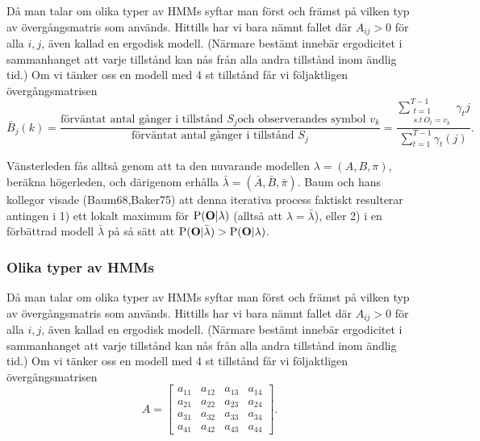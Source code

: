 \documentclass[../rapport_MVEX01-11-05]{subfiles}
\begin{document}
Då man talar om olika typer av HMMs syftar man först och främst på
vilken typ av övergångsmatris som används. Hittills har vi bara nämnt
fallet där $A_{ij} > 0$ för alla $i,j$, även kallad en ergodisk
modell. (Närmare bestämt innebär ergodicitet i sammanhanget att varje
tillstånd kan nås från alla andra tillstånd inom ändlig tid.) Om vi
tänker oss en modell med 4 st tillstånd får vi följaktligen övergångsmatrisen
\begin{equation*}
\bar{B}_j(k) = \frac{\text{förväntat antal gånger i tillstånd $S_j$
    och observerandes symbol $v_k$}}{\text{förväntat antal gånger i
    tillstånd $S_j$}} = \frac{\sum_{\substack{t=1\\s.t~ O_t =
      v_k}}^{T-1}\gamma_t{j}}{\sum_{t=1}^{T-1}\gamma_t(j)}.
\end{equation*}

Vänsterleden fås alltså genom att ta den nuvarande modellen $\lambda =
(A,B,\pi)$, beräkna högerleden, och därigenom erhålla $\bar{\lambda} =
(\bar{A},\bar{B}, \bar{\pi})$. Baum och hans kollegor visade
(Baum68,Baker75) att denna iterativa process faktiskt resulterar
antingen i 1) ett lokalt maximum för $\mathrm{P}(\textbf{O}|\lambda)$
(alltså att $\lambda = \bar{\lambda}$), eller 2) i en förbättrad
modell $\bar{\lambda}$ på så sätt att
$\mathrm{P}(\textbf{O}|\bar{\lambda}) > \mathrm{P}(\textbf{O}|\lambda)$. 

\subsubsection{Olika typer av HMMs}

Då man talar om olika typer av HMMs syftar man först och främst på
vilken typ av övergångsmatris som används. Hittills har vi bara nämnt
fallet där $A_{ij} > 0$ för alla $i,j$, även kallad en ergodisk
modell. (Närmare bestämt innebär ergodicitet i sammanhanget att varje
tillstånd kan nås från alla andra tillstånd inom ändlig tid.) Om vi
tänker oss en modell med 4 st tillstånd får vi följaktligen övergångsmatrisen
\begin{equation*}
A = \begin{bmatrix}
a_{11} & a_{12} & a_{13} & a_{14}\\
a_{21} & a_{22} & a_{23} & a_{24}\\
a_{31} & a_{32} & a_{33} & a_{34}\\
a_{41} & a_{42} & a_{43} & a_{44}
\end{bmatrix}.  
\end{equation*} 
\end{document}
